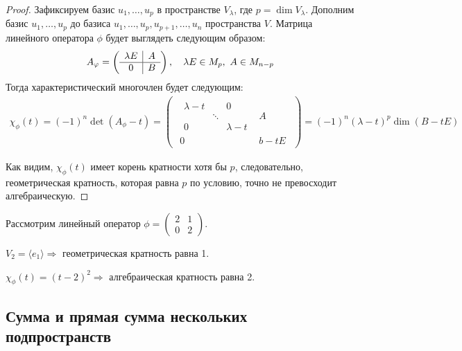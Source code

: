\begin{proof}
	Зафиксируем базис $u_1, \ldots, u_p$ в пространстве $V_\lambda$, где $p = \dim{V_\lambda}$. Дополним базис $u_1, \ldots, u_p$ до базиса $u_1, \ldots, u_p, u_{p+1}, \ldots, u_n$ пространства $V$. Матрица линейного оператора $\phi$ будет выглядеть следующим образом:
	\begin{gather*}
	A_\phi = 
		\begin{pmatrix*}
		\begin{array}{c|c}
		\l E & A \\ \hline
		0 & B
		\end{array}
		\end{pmatrix*}, \quad \lambda E \in M_p,\ A \in M_{n-p}
	\end{gather*}
	Тогда характеристический многочлен будет следующим:
	\begin{gather*}
	\chi_\phi(t) = (-1)^n \det (A_\phi - t) = 
	\begin{pmatrix}
	\begin{array}{c|c}
	\begin{matrix}
	\lambda - t &  & 0 \\
	 & \ddots &  \\
	0 &  & \lambda - t
	\end{matrix}
	& A \\ \hline
	0 & b - tE
	\end{array}
	\end{pmatrix}
	 = (-1)^n(\lambda - t)^p\dim(B - tE)
	\end{gather*}
	
	Как видим, $\chi_\phi(t)$ имеет корень кратности хотя бы $p$, следовательно, геометрическая кратность, которая равна $p$ по условию, точно не превосходит алгебраическую. 
\end{proof}

\begin{Examples} Рассмотрим линейный оператор $\phi = \begin{pmatrix}
    2& 1 \\
    0& 2
    \end{pmatrix}$.
        
    $V_2 = \langle e_1\rangle \Rightarrow$ геометрическая кратность равна 1.
    
    $\chi_\phi(t) = (t-2)^2 \Rightarrow$ алгебраическая кратность равна 2.
\end{Examples}

\subsection*{Сумма и прямая сумма нескольких подпространств}

